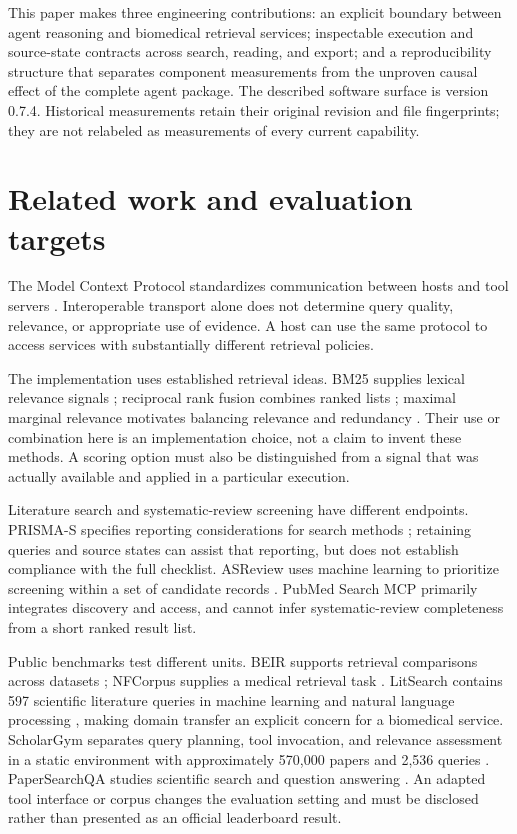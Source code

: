 \documentclass[11pt]{article}
\begin{document}
This paper makes three engineering contributions: an explicit boundary between
agent reasoning and biomedical retrieval services; inspectable execution and
source-state contracts across search, reading, and export; and a reproducibility
structure that separates component measurements from the unproven causal effect
of the complete agent package. The described software surface is version 0.7.4.
Historical measurements retain their original revision and file fingerprints;
they are not relabeled as measurements of every current capability.

\section{Related work and evaluation targets}
The Model Context Protocol standardizes communication between hosts and tool
servers \citep{mcp2026}. Interoperable transport alone does not determine query
quality, relevance, or appropriate use of evidence. A host can use the same
protocol to access services with substantially different retrieval policies.

The implementation uses established retrieval ideas. BM25 supplies lexical
relevance signals \citep{robertson2009bm25}; reciprocal rank fusion combines ranked
lists \citep{cormack2009rrf}; maximal marginal relevance motivates balancing
relevance and redundancy \citep{carbonell1998mmr}. Their use or combination here is
an implementation choice, not a claim to invent these methods. A scoring option
must also be distinguished from a signal that was actually available and applied
in a particular execution.

Literature search and systematic-review screening have different endpoints.
PRISMA-S specifies reporting considerations for search methods
\citep{rethlefsen2021prismas}; retaining queries and source states can assist that
reporting, but does not establish compliance with the full checklist. ASReview
uses machine learning to prioritize screening within a set of candidate records
\citep{vandeschoot2021asreview}. PubMed Search MCP primarily integrates discovery
and access, and cannot infer systematic-review completeness from a short ranked
result list.

Public benchmarks test different units. BEIR supports retrieval comparisons
across datasets \citep{thakur2021beir}; NFCorpus supplies a medical retrieval task
\citep{nfcorpus}. LitSearch contains 597 scientific literature queries in machine
learning and natural language processing \citep{ajith2024litsearch}, making domain
transfer an explicit concern for a biomedical service. ScholarGym separates query
planning, tool invocation, and relevance assessment in a static environment with
approximately 570,000 papers and 2,536 queries \citep{shen2026scholargym}.
PaperSearchQA studies scientific search and question answering
\citep{burgess2026papersearchqa}. An adapted tool interface or corpus changes the
evaluation setting and must be disclosed rather than presented as an official
leaderboard result.
\end{document}
